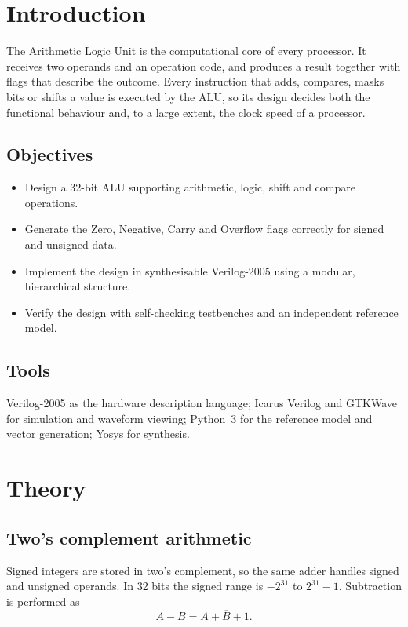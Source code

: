 \documentclass[11pt,a4paper]{article}
\begin{document}
\section{Introduction}
The Arithmetic Logic Unit is the computational core of every processor. It receives two operands and an operation code, and produces a result together with flags that describe the outcome. Every instruction that adds, compares, masks bits or shifts a value is executed by the ALU, so its design decides both the functional behaviour and, to a large extent, the clock speed of a processor.

\subsection{Objectives}
\begin{itemize}
\item Design a 32-bit ALU supporting arithmetic, logic, shift and compare operations.
\item Generate the Zero, Negative, Carry and Overflow flags correctly for signed and unsigned data.
\item Implement the design in synthesisable Verilog-2005 using a modular, hierarchical structure.
\item Verify the design with self-checking testbenches and an independent reference model.
\end{itemize}

\subsection{Tools}
Verilog-2005 as the hardware description language; Icarus Verilog and GTKWave for simulation and waveform viewing; Python~3 for the reference model and vector generation; Yosys for synthesis.

\section{Theory}
\subsection{Two's complement arithmetic}
Signed integers are stored in two's complement, so the same adder handles signed and unsigned operands. In 32 bits the signed range is $-2^{31}$ to $2^{31}-1$. Subtraction is performed as
\[ A - B = A + \overline{B} + 1 . \]
\end{document}
